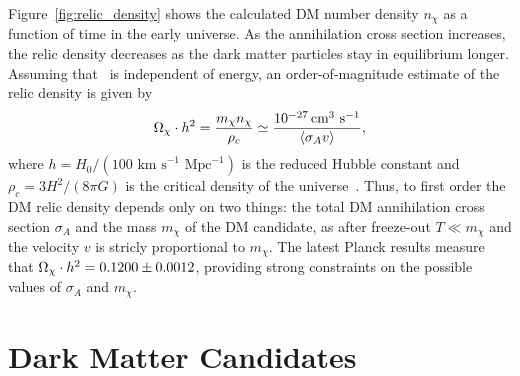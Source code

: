 Figure~\ref{fig:relic_density} shows the calculated DM number density $n_\chi$ as a function of time in the early universe.
As the annihilation cross section increases, the relic density decreases as the dark matter particles stay in equilibrium longer.
Assuming that \sigmav\ is independent of energy, an order-of-magnitude estimate of the relic density is given by
\begin{equation}
  \label{eqn:relic_density}
  \Omega_\chi \cdot h^2 = \frac{m_\chi n_\chi}{\rho_c} \simeq \frac{10^{-27} \,\text{cm}^{3}\text{ s}^{-1}}{\langle \sigma_A v \rangle},
\end{equation}
where $h = H_0/(100 \text{ km s}^{-1}\text{ Mpc}^{-1})$ is the reduced Hubble constant and $\rho_c = 3H^2/(8\pi G)$ is the critical density of the universe~\cite{Jungman1996}.
Thus, to first order the DM relic density depends only on two things: the total DM annihilation cross section $\sigma_A$ and the mass $m_\chi$ of the DM candidate, as after freeze-out $T \ll m_\chi$ and the velocity $v$ is stricly proportional to $m_\chi$. 
The latest Planck results measure that $\Omega_\chi \cdot h^2 = 0.1200 \pm 0.0012$, providing strong constraints on the possible values of $\sigma_A$ and $m_\chi$.

\section{Dark Matter Candidates}
\label{sec:dm_cand}

